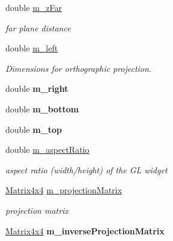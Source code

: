 \begin{Indent}
\begin{DoxyCompactItemize}
\mbox{\label{classrev_1_1_render_projection_a2add182ecf24c3877bb6891a8a8f4206}} 
double \mbox{\hyperlink{classrev_1_1_render_projection_a2add182ecf24c3877bb6891a8a8f4206}{m\+\_\+z\+Far}}
\begin{DoxyCompactList}\small\item\em far plane distance \end{DoxyCompactList}\item 
\mbox{\label{classrev_1_1_render_projection_a8f87eabad951e11897ac4188fec1bab4}} 
double \mbox{\hyperlink{classrev_1_1_render_projection_a8f87eabad951e11897ac4188fec1bab4}{m\+\_\+left}}
\begin{DoxyCompactList}\small\item\em Dimensions for orthographic projection. \end{DoxyCompactList}\item 
\mbox{\label{classrev_1_1_render_projection_a17edfb41712b16db4f500a8880a04d69}} 
double {\bfseries m\+\_\+right}
\item 
\mbox{\label{classrev_1_1_render_projection_a2d992188fc2bf20f3b0123ebd8f669b3}} 
double {\bfseries m\+\_\+bottom}
\item 
\mbox{\label{classrev_1_1_render_projection_a68ce91371b406551485dcaa76fc15f5b}} 
double {\bfseries m\+\_\+top}
\item 
\mbox{\label{classrev_1_1_render_projection_a38ce8481beda3f872a3e1d212d824878}} 
double \mbox{\hyperlink{classrev_1_1_render_projection_a38ce8481beda3f872a3e1d212d824878}{m\+\_\+aspect\+Ratio}}
\begin{DoxyCompactList}\small\item\em aspect ratio (width/height) of the GL widget \end{DoxyCompactList}\item 
\mbox{\hyperlink{classrev_1_1_square_matrix}{Matrix4x4}} \mbox{\hyperlink{classrev_1_1_render_projection_ae00290a86c36083452ae9000745b9451}{m\+\_\+projection\+Matrix}}
\begin{DoxyCompactList}\small\item\em projection matrix \end{DoxyCompactList}\item 
\mbox{\label{classrev_1_1_render_projection_a44e7a2fe1f91f48b94e16740cf3289f0}} 
\mbox{\hyperlink{classrev_1_1_square_matrix}{Matrix4x4}} {\bfseries m\+\_\+inverse\+Projection\+Matrix}
\end{DoxyCompactItemize}
\end{Indent}
